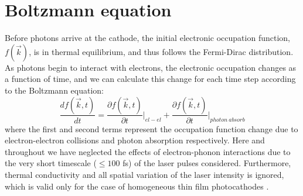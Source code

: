 \section{Boltzmann equation}

Before photons arrive at the cathode, the initial electronic occupation function, $f(\vec{k})$, is in thermal equilibrium, and thus follows the Fermi-Dirac distribution. As photons begin to interact with electrons, the electronic occupation changes as a function of time, and we can calculate this change for each time step according to the Boltzmann equation:
\begin{equation}
	\frac{d f(\vec{k},t)}{d t} = \frac{\partial f(\vec{k},t)}{\partial t}\biggr|_{el-el} +  \frac{\partial f(\vec{k},t)}{\partial t}\biggr|_{photon\: absorb}
	\label{bolt}
\end{equation}
where the first and second terms represent the occupation function change due to electron-electron collisions and photon absorption respectively. Here and throughout we have neglected the effects of electron-phonon interactions due to the very short timescale ($\leq 100$ fs) of the laser pulses considered. Furthermore, thermal conductivity and all spatial variation of the laser intensity is ignored, which is valid only for the case of homogeneous thin film photocathodes \cite{boltzmann}.

